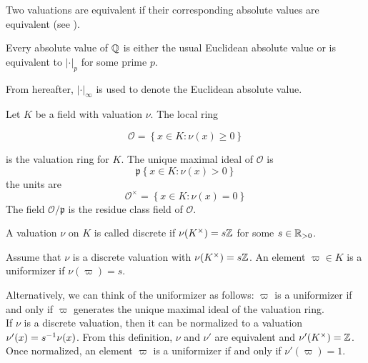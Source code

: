 \begin{definition}
    Two valuations are equivalent if their corresponding absolute values are equivalent (see ).
\end{definition}

\begin{theorem}
    Every absolute value of $\mathbb{Q}$ is either the usual Euclidean absolute value or is equivalent to $|\cdot|_p$ for some prime $p$.
\end{theorem}

From hereafter, $|\cdot|_\infty$ is used to denote the Euclidean absolute value.

\begin{definition}
    Let $K$ be a field with valuation $\nu$. The local ring 

    \[ \mathcal{O} = \left\{x \in K: \nu(x) \geq 0\right\}\]

    is the valuation ring for $K$. The unique maximal ideal of $\mathcal{O}$ is 
        \[\mathfrak{p} \left\{x \in K: \nu(x) > 0\right\}\]
    the units are
        \[\mathcal{O}^\times = \left\{x \in K : \nu(x) = 0\right\}\]
    The field $\mathcal{O}/\mathfrak{p}$ is the residue class field of $\mathcal{O}$.
\end{definition}

\begin{definition}

    A valuation $\nu$ on $K$ is called discrete if $\nu(K^\times) = s\mathbb{Z}$ for some $s \in \mathbb{R}_{>0}$.
\end{definition}

\begin{definition}[Uniformizer]
    Assume that $\nu$ is a discrete valuation with $\nu(K^\times) = s\mathbb{Z}$. An element $\varpi \in K$ is a uniformizer if $\nu(\varpi) = s$.
\end{definition}

Alternatively, we can think of the uniformizer as follows: $\varpi$ is a uniformizer if and only if $\varpi$ generates the unique maximal ideal of the valuation ring.\\

If $\nu$ is a discrete valuation, then it can be normalized to a valuation $\nu'(x) = s^{-1} \nu(x)$.  From this definition, $\nu$ and $\nu'$ are equivalent and $\nu'(K^\times) = \mathbb{Z}$. Once normalized, an element $\varpi$ is a uniformizer if and only if $\nu'(\varpi) = 1$.

